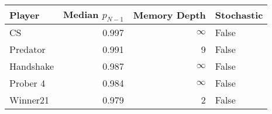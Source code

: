 \begin{tabular}{lrrl}
\toprule
    Player &  Median $p_{N-1}$ &  Memory Depth & Stochastic \\
\midrule
        CS &             0.997 &            \(\infty\) &      False \\
  Predator &             0.991 &             9 &      False \\
 Handshake &             0.987 &            \(\infty\) &      False \\
  Prober 4 &             0.984 &            \(\infty\) &      False \\
  Winner21 &             0.979 &             2 &      False \\
\bottomrule
\end{tabular}
